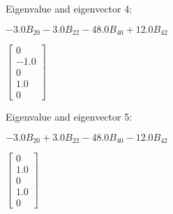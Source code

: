 \documentclass[8pt]{report}
\begin{document}
Eigenvalue and eigenvector 4:

\begin{math}
- 3.0 B_{20} - 3.0 B_{22} - 48.0 B_{40} + 12.0 B_{42}
\end{math}

\begin{math}
\left[\begin{matrix}0\\-1.0\\0\\1.0\\0\end{matrix}\right]
\end{math}

Eigenvalue and eigenvector 5:

\begin{math}
- 3.0 B_{20} + 3.0 B_{22} - 48.0 B_{40} - 12.0 B_{42}
\end{math}

\begin{math}
\left[\begin{matrix}0\\1.0\\0\\1.0\\0\end{matrix}\right]
\end{math}
\end{document}
